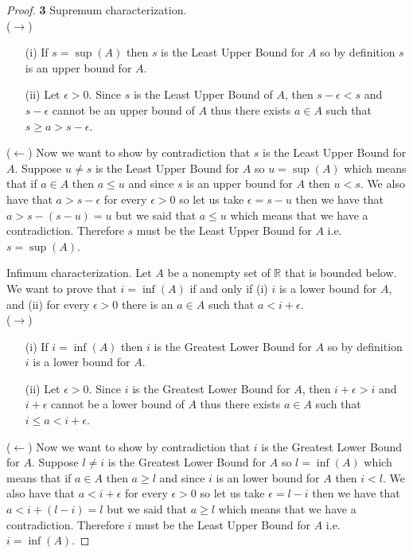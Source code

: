 \documentclass[11pt]{article}
\newcommand{\R}{\mathbb{R}}
\theoremstyle{definition}
\begin{document}
    \begin{proof}{\textbf{3}} Supremum characterization.\\
        ($\rightarrow$)
        \begin{itemize}
            \item [(i)] If $s = \sup(A)$ then $s$ is the Least Upper Bound
            for $A$ so by definition $s$ is an upper bound for $A$.
            \item[(ii)] Let $\epsilon>0$. Since $s$ is the Least Upper Bound
            of $A$, then $s-\epsilon<s$ and $s - \epsilon$ cannot be an upper bound of
            $A$ thus there exists $a \in A$ such that $s \geq a > s - \epsilon$.
        \end{itemize}
        ($\leftarrow$)
        Now we want to show by contradiction that $s$ is the Least Upper Bound for $A$. 
        Suppose $u \neq s$ is the Least Upper Bound for $A$ so $u = \sup(A)$ which means that
        if $a \in A$ then $a \leq u$ and since $s$ is an upper bound for $A$ then
        $u<s$. We also have that $a>s-\epsilon$ for every $\epsilon > 0$ so let us take
        $\epsilon = s - u$ then we have that $a>s - (s-u) = u$ but we said that
        $a \leq u$ which means that we have a contradiction. Therefore $s$ must be the
        Least Upper Bound for $A$ i.e. $s = \sup(A)$.

        Infimum characterization. Let $A$ be a nonempty set of $\R$ that is bounded
        below. We want to prove that $i = \inf(A)$ if and only if (i) $i$ is a lower
        bound for $A$, and (ii) for every $\epsilon >0$ there is an $a \in A$ such that
        $a< i + \epsilon$.\\
        ($\rightarrow$)
        \begin{itemize}
            \item [(i)] If $i = \inf(A)$ then $i$ is the Greatest Lower Bound
            for $A$ so by definition $i$ is a lower bound for $A$.
            \item[(ii)] Let $\epsilon>0$. Since $i$ is the Greatest Lower Bound
            for $A$, then $i+\epsilon>i$ and $i + \epsilon$ cannot be a lower bound of
            $A$ thus there exists $a \in A$ such that $i \leq a < i + \epsilon$.
        \end{itemize}
        ($\leftarrow$)
        Now we want to show by contradiction that $i$ is the Greatest Lower Bound for $A$. 
        Suppose $l \neq i$ is the Greatest Lower Bound for $A$ so $l = \inf(A)$ which
        means that if $a \in A$ then $a \geq l$ and since $i$ is an lower bound for $A$
        then $i<l$. We also have that $a<i+\epsilon$ for every $\epsilon > 0$ so let us
        take $\epsilon = l-i$ then we have that $a<i + (l-i) = l$ but we said that
        $a \geq l$ which means that we have a contradiction. Therefore $i$ must be the
        Least Upper Bound for $A$ i.e. $i = \inf(A)$.
    \end{proof}
\end{document}
